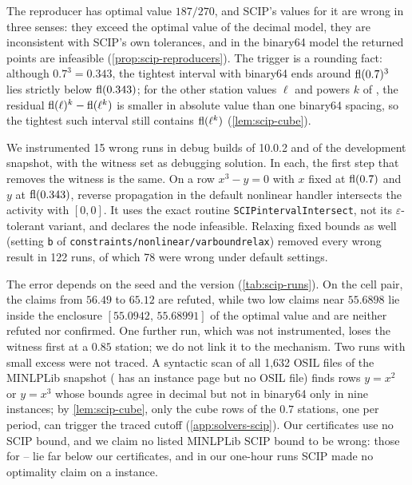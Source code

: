 The reproducer  has optimal value $187/270$, and SCIP's values for it are wrong in three senses: they exceed the optimal value of the decimal model, they are inconsistent with SCIP's own tolerances, and in the binary64 model the returned points are infeasible (\cref{prop:scip-reproducers}).
The trigger is a rounding fact: although $0.7^3=0.343$, the tightest interval with binary64 ends around $\operatorname{fl}(0.7)^3$ lies strictly below $\operatorname{fl}(0.343)$; for the other station values $\ell$ and powers $k$ of , the residual $\operatorname{fl}(\ell)^k-\operatorname{fl}(\ell^k)$ is smaller in absolute value than one binary64 spacing, so the tightest such interval still contains $\operatorname{fl}(\ell^k)$ (\cref{lem:scip-cube}).

\begin{observation}\label{obs:scip-propagation}
We instrumented 15 wrong runs in debug builds of 10.0.2 and of the development snapshot, with the witness set as debugging solution.
In each, the first step that removes the witness is the same.
On a row $x^3-y=0$ with $x$ fixed at $\operatorname{fl}(0.7)$ and $y$ at $\operatorname{fl}(0.343)$, reverse propagation in the default nonlinear handler intersects the activity with $[0,0]$.
It uses the exact routine \texttt{SCIPintervalIntersect}, not its $\varepsilon$-tolerant variant, and declares the node infeasible.
Relaxing fixed bounds as well (setting \texttt{b} of \texttt{constraints/\allowbreak nonlinear/\allowbreak varboundrelax}) removed every wrong result in 122 runs, of which 78 were wrong under default settings.
\end{observation}

The error depends on the seed and the version (\cref{tab:scip-runs}).
On the cell pair, the claims from $56.49$ to $65.12$ are refuted, while two low claims near $55.6898$ lie inside the enclosure $[55.0942,\,55.68991]$ of the optimal value and are neither refuted nor confirmed.
One further run, which was not instrumented, loses the witness first at a $0.85$ station; we do not link it to the mechanism.
Two runs with small excess were not traced.
A syntactic scan of all 1,632 OSIL files of the MINLPLib snapshot ( has an instance page but no OSIL file) finds rows $y=x^2$ or $y=x^3$ whose bounds agree in decimal but not in binary64 only in nine  instances; by \cref{lem:scip-cube}, only the cube rows of the $0.7$ stations, one per period, can trigger the traced cutoff (\cref{app:solvers-scip}).
Our certificates use no SCIP bound, and we claim no listed MINLPLib SCIP bound to be wrong: those for -- lie far below our certificates, and in our one-hour runs SCIP made no optimality claim on a  instance.

